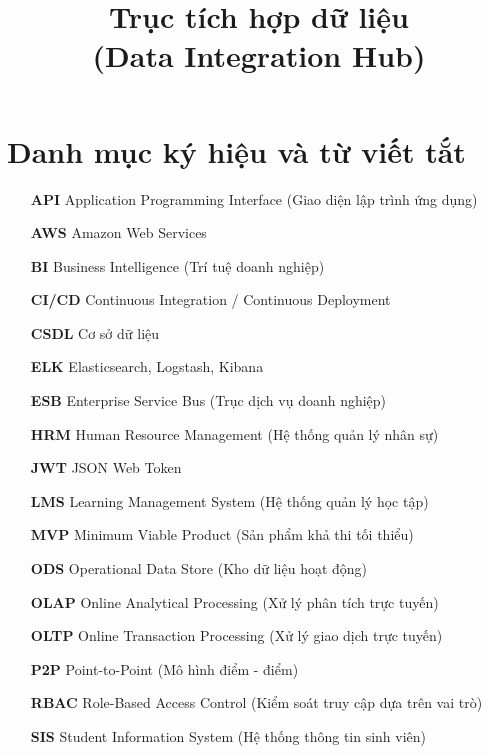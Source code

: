 \documentclass[twoside,final]{hcmut-report}
\title{Trục tích hợp dữ liệu \\(Data Integration Hub)}
\begin{document}
\coverpage%

\tableofcontents
\listoffigures
\listoftables

\clearpage
\chapter*{Danh mục ký hiệu và từ viết tắt}

\begin{itemize}[leftmargin=3cm, labelsep=1cm]
    \item[\textbf{API}] Application Programming Interface (Giao diện lập trình ứng dụng)
    \item[\textbf{AWS}] Amazon Web Services
    \item[\textbf{BI}] Business Intelligence (Trí tuệ doanh nghiệp)
    \item[\textbf{CI/CD}] Continuous Integration / Continuous Deployment
    \item[\textbf{CSDL}] Cơ sở dữ liệu
    \item[\textbf{ELK}] Elasticsearch, Logstash, Kibana
    \item[\textbf{ESB}] Enterprise Service Bus (Trục dịch vụ doanh nghiệp)
    \item[\textbf{HRM}] Human Resource Management (Hệ thống quản lý nhân sự)
    \item[\textbf{JWT}] JSON Web Token
    \item[\textbf{LMS}] Learning Management System (Hệ thống quản lý học tập)
    \item[\textbf{MVP}] Minimum Viable Product (Sản phẩm khả thi tối thiểu)
    \item[\textbf{ODS}] Operational Data Store (Kho dữ liệu hoạt động)
    \item[\textbf{OLAP}] Online Analytical Processing (Xử lý phân tích trực tuyến)
    \item[\textbf{OLTP}] Online Transaction Processing (Xử lý giao dịch trực tuyến)
    \item[\textbf{P2P}] Point-to-Point (Mô hình điểm - điểm)
    \item[\textbf{RBAC}] Role-Based Access Control (Kiểm soát truy cập dựa trên vai trò)
    \item[\textbf{SIS}] Student Information System (Hệ thống thông tin sinh viên)
\end{itemize}
\clearpage

\clearpage








\clearpage



\nocite{*}
\end{document}
